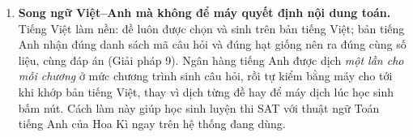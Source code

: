 \begin{enumerate}[label=(\arabic*), leftmargin=1.2cm, itemsep=2pt]
        \textit{làm sao chắc chắn máy không dạy sai cho học sinh}.
  \item \textbf{Song ngữ Việt--Anh mà không để máy quyết định nội dung toán.}
        Tiếng Việt làm nền: đề luôn được chọn và sinh trên bản tiếng Việt; bản
        tiếng Anh nhận đúng danh sách mã câu hỏi và đúng hạt giống nên ra đúng
        cùng số liệu, cùng đáp án (Giải pháp 9). Ngân hàng tiếng Anh được dịch
        \textit{một lần cho mỗi chương} ở mức chương trình sinh câu hỏi, rồi tự
        kiểm bằng máy cho tới khi khớp bản tiếng Việt, thay vì dịch từng đề hay
        để máy dịch lúc học sinh bấm nút. Cách làm này giúp học sinh luyện thi
        SAT với thuật ngữ Toán tiếng Anh của Hoa Kì ngay trên hệ thống đang dùng.
\end{enumerate}




\clearpage
